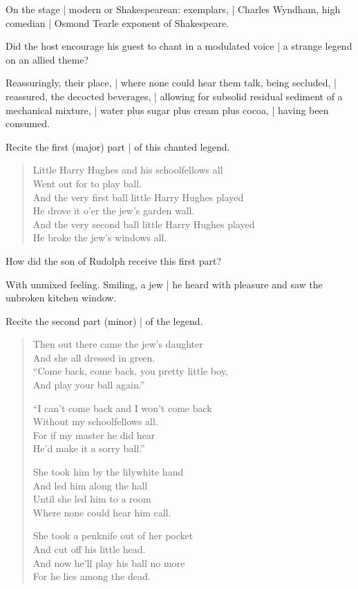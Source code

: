 \Poetry
On the stage |
modern or Shakespearean:
exemplars, |
Charles Wyndham, high comedian |
Osmond Tearle
exponent of Shakespeare.


Did the host encourage his guest to chant in a modulated voice |
a strange legend on an allied theme?

\Science
Reassuringly, their place, |
where none could hear them talk, being secluded, |
reassured, the decocted beverages, |
allowing for subsolid residual sediment of a mechanical mixture, |
water plus sugar plus cream plus cocoa, |
having been consumed.%


Recite the first (major) part |
of this chanted legend.

\Poetry

\begin{verse}
    Little Harry Hughes and his schoolfellows all\\
    Went out for to play ball.\\
    And the very first ball little Harry Hughes played\\
    He drove it o'er the jew's garden wall.\\
    And the very second ball little Harry Hughes played\\
    He broke the jew's windows all.
\end{verse}


How did the son of Rudolph receive this first part?

\Factual
With unmixed feeling.
Smiling, a jew |
he heard with pleasure and saw the
unbroken kitchen window.


Recite the second part (minor) |
of the legend.

\Poetry

\begin{verse}
    Then out there came the jew's daughter\\
    And she all dressed in green.\\
    ``Come back, come back, you pretty little boy,\\
    And play your ball again.''

    ``I can't come back and I won't come back\\
    Without my schoolfellows all.\\
    For if my master he did hear\\
    He'd make it a sorry ball.''%

    She took him by the lilywhite hand\\
    And led him along the hall\\
    Until she led him to a room\\
    Where none could hear him call.

    She took a penknife out of her pocket\\
    And cut off his little head.\\
    And now he'll play his ball no more\\
    For he lies among the dead.
\end{verse}


